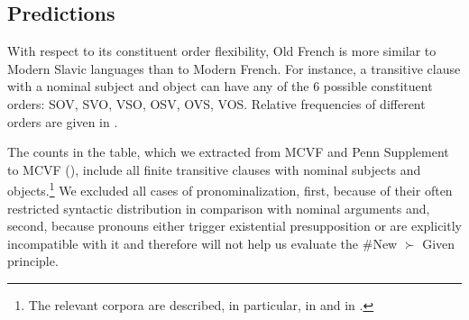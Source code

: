 \documentclass[output=paper,modfonts,nonflat]{langsci/langscibook}
\begin{document}
\subsection{Predictions}

With respect to its constituent order flexibility, Old French is more similar to Modern Slavic languages than to Modern French. For instance, a transitive clause with a nominal subject and object can have any of the 6 possible constituent orders: SOV, SVO, VSO, OSV, OVS, VOS. Relative frequencies of different orders are given in . 




The counts in the table, which we extracted from MCVF \cite{MCVF} and Penn Supplement to MCVF (\citealt{KrochSantorini:2010}), include all finite transitive clauses with nominal subjects and objects.\footnote{The relevant corpora are described, in particular, in \citet{Martineau:2008} and in \citet{SimonenkoCrabbePrevost:2018}.} We excluded all cases of pronominalization, first, because of their often restricted syntactic distribution in comparison with nominal arguments and, second, because pronouns either trigger existential presupposition or are explicitly incompatible with it and therefore will not help us evaluate the \#New $\succ$ Given principle.
\end{document}
